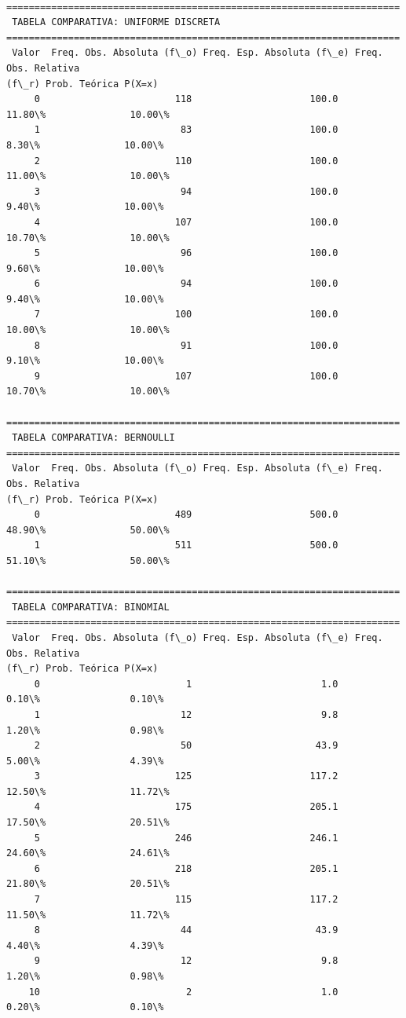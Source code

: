 \documentclass[11pt]{article}
\begin{document}
    \begin{Verbatim}[commandchars=\\\{\}]

======================================================================
 TABELA COMPARATIVA: UNIFORME DISCRETA
======================================================================
 Valor  Freq. Obs. Absoluta (f\_o) Freq. Esp. Absoluta (f\_e) Freq. Obs. Relativa
(f\_r) Prob. Teórica P(X=x)
     0                        118                     100.0
11.80\%               10.00\%
     1                         83                     100.0
8.30\%               10.00\%
     2                        110                     100.0
11.00\%               10.00\%
     3                         94                     100.0
9.40\%               10.00\%
     4                        107                     100.0
10.70\%               10.00\%
     5                         96                     100.0
9.60\%               10.00\%
     6                         94                     100.0
9.40\%               10.00\%
     7                        100                     100.0
10.00\%               10.00\%
     8                         91                     100.0
9.10\%               10.00\%
     9                        107                     100.0
10.70\%               10.00\%

======================================================================
 TABELA COMPARATIVA: BERNOULLI
======================================================================
 Valor  Freq. Obs. Absoluta (f\_o) Freq. Esp. Absoluta (f\_e) Freq. Obs. Relativa
(f\_r) Prob. Teórica P(X=x)
     0                        489                     500.0
48.90\%               50.00\%
     1                        511                     500.0
51.10\%               50.00\%

======================================================================
 TABELA COMPARATIVA: BINOMIAL
======================================================================
 Valor  Freq. Obs. Absoluta (f\_o) Freq. Esp. Absoluta (f\_e) Freq. Obs. Relativa
(f\_r) Prob. Teórica P(X=x)
     0                          1                       1.0
0.10\%                0.10\%
     1                         12                       9.8
1.20\%                0.98\%
     2                         50                      43.9
5.00\%                4.39\%
     3                        125                     117.2
12.50\%               11.72\%
     4                        175                     205.1
17.50\%               20.51\%
     5                        246                     246.1
24.60\%               24.61\%
     6                        218                     205.1
21.80\%               20.51\%
     7                        115                     117.2
11.50\%               11.72\%
     8                         44                      43.9
4.40\%                4.39\%
     9                         12                       9.8
1.20\%                0.98\%
    10                          2                       1.0
0.20\%                0.10\%


\end{Verbatim}
\end{document}
